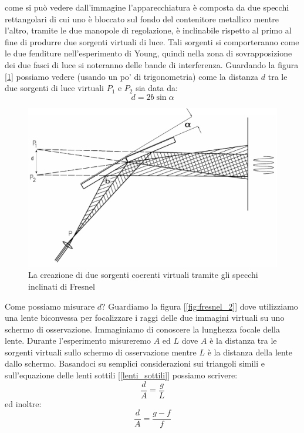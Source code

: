 \documentclass[a4paper,10pt,oneside]{article}
\begin{document}
come si può vedere dall'immagine l'apparecchiatura è composta da due specchi rettangolari di cui uno è bloccato sul fondo del contenitore metallico mentre l'altro, tramite le due manopole di regolazione, è inclinabile rispetto al primo al fine di produrre due sorgenti virtuali di luce. Tali sorgenti si comporteranno come le due fenditure nell'esperimento di Young, quindi nella zona di sovrapposizione dei due fasci di luce si noteranno delle bande di interferenza. Guardando la figura [\ref{fig:fresnel_mirror1}] possiamo vedere (usando un po' di trigonometria) come la  distanza $d$ tra le due sorgenti di luce virtuali $P_1$ e $P_2$ sia data da:
\begin{equation}
 d=2b\sin \alpha
\end{equation}

\begin{figure}[H]
 \centering
 \includegraphics[width=\textwidth]{./Immagini/fresnel_mirrors_comment.png}
 \caption{La creazione di due sorgenti coerenti virtuali tramite gli specchi inclinati di Fresnel}
 \label{fig:fresnel_mirror1}
\end{figure}

Come possiamo misurare $d$? Guardiamo la figura [\ref{fig:fresnel_2}] dove utilizziamo una lente biconvessa per focalizzare i raggi delle due immagini virtuali su uno schermo di osservazione. Immaginiamo di conoscere la lunghezza focale della lente. Durante l'esperimento misureremo $A$ ed $L$ dove $A$ è la distanza tra le sorgenti virtuali sullo schermo di osservazione mentre $L$ è la distanza della lente dallo schermo. Basandoci su semplici considerazioni sui triangoli simili e sull'equazione delle lenti sottili [\ref{lenti_sottili}] possiamo scrivere:
\begin{equation}
 \frac{d}{A}=\frac{g}{L}
\end{equation}
ed inoltre:
\begin{equation}
 \frac{d}{A}=\frac{g-f}{f}
\end{equation}
\end{document}
